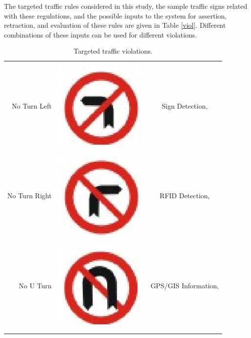 \documentclass[letterpaper, 10 pt, conference]{ieeeconf}
\begin{document}
The targeted traffic rules considered in this study, the sample traffic signs related with these regulations, and the possible inputs to the system for assertion, retraction, and evaluation of these rules are given in Table \ref{viol}. Different combinations of these inputs can be used for different violations. 

\begin{table}[!ht]
\caption{Targeted traffic violations.}
\centering
{\scriptsize
\begin{tabular}{|r|r|c|}
\hline
&&\\
No Turn Left & \includegraphics[scale=0.25]{img/noleft} & Sign Detection,\\
&&\\
\cline{1-2}
&&\\
No Turn Right & \includegraphics[scale=0.25]{img/noright} & RFID Detection,\\
&&\\
\cline{1-2}
&&\\
 No U Turn & \includegraphics[scale=0.25]{img/nouturn} & GPS/GIS Information,\\
&&\\
\cline{1-2}
&&\\

\end{tabular}}
\end{table}
\end{document}
